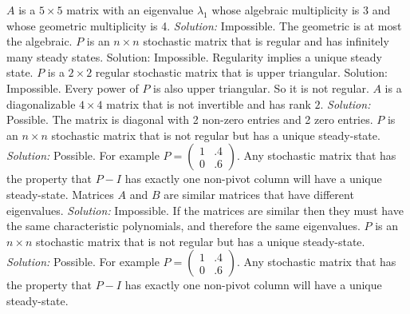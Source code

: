 \fi
\ifnum {}
    $A$ is a $5\times 5$ matrix with an eigenvalue $\lambda_1$ whose algebraic multiplicity is 3 and whose geometric multiplicity is 4.
    \ifnum {} {\color{DarkBlue} \textit{Solution:  } Impossible. The geometric is at most the algebraic. } \fi
\fi
\ifnum {} 
\setlength{\extrarowheight}{0.00cm}
 $P$ is an $n\times n$ stochastic matrix that is  regular  and has infinitely many steady states. 
    \ifnum {} {\color{DarkBlue} Solution: Impossible. Regularity implies a unique steady state.  
    } \fi
\fi
\ifnum {}
    \setlength{\extrarowheight}{0.00cm}  
    $P$ is a $2\times 2$ regular stochastic matrix that is upper triangular. 
    \ifnum {} {\color{DarkBlue} Solution:  Impossible. Every power of $P$ is also upper triangular. So it is not regular. 
    } \fi
\fi
\ifnum {}
    \setlength{\extrarowheight}{0.00cm} 
       $A$ is a diagonalizable $4\times 4$ matrix that is not invertible and has rank $2$. 
    \ifnum {} {\color{DarkBlue} \textit{Solution:  } Possible. 
    The matrix is diagonal with 2 non-zero entries and 2  zero entries.} \fi
\fi      
\ifnum {}
    $P$ is an $n\times n$ stochastic matrix that is not regular but has a unique steady-state.
    \ifnum {} {\color{DarkBlue} \textit{Solution:  } Possible. For example \setlength{\extrarowheight}{0.0cm}
    $P = \begin{pmatrix} 1&.4\\0&.6\end{pmatrix}$. Any stochastic matrix that has the property that $P-I$ has exactly one non-pivot column will have a unique steady-state. } \fi
\fi    
\ifnum {} %
    Matrices $A$ and $B$ are similar matrices that have different eigenvalues. \setlength{\extrarowheight}{0.00cm} 
    \ifnum {} {\color{DarkBlue} \textit{Solution:  } Impossible. If the matrices are similar then they must have the same characteristic polynomials, and therefore the same eigenvalues.
    } \fi
\fi    
\ifnum {} %
    $P$ is an $n\times n$ stochastic matrix that is not regular but has a unique steady-state.\setlength{\extrarowheight}{0.00cm} 
    \ifnum {} {\color{DarkBlue} \textit{Solution:  } Possible. For example \setlength{\extrarowheight}{0.0cm}
    $P = \begin{pmatrix} 1&.4\\0&.6\end{pmatrix}$. Any stochastic matrix that has the property that $P-I$ has exactly one non-pivot column will have a unique steady-state.
    } \fi
